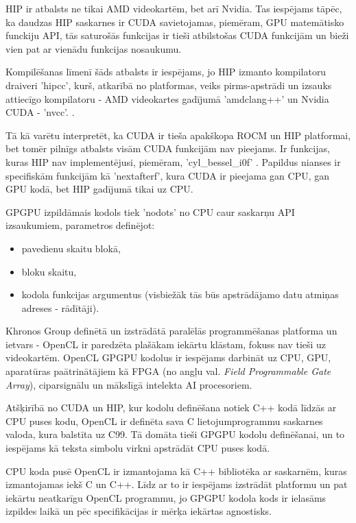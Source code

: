 HIP ir atbalsts ne tikai AMD videokartēm, bet arī Nvidia. Tas iespējams tāpēc, ka 
daudzas HIP saskarnes ir CUDA savietojamas, piemēram, GPU matemātisko funckiju API, tās saturošās funkcijas
ir tieši atbilstošas CUDA funkcijām un bieži vien pat ar vienādu funkcijas nosaukumu.
\cite{HIP_math_API,CUDA_math_API}

Kompilēšanas līmenī šāds atbalsts ir iespējams, jo HIP izmanto kompilatoru draiveri 'hipcc', kurš,
atkarībā no platformas, veiks pirms-apstrādi un izsauks attiecīgo kompilatoru -
AMD videokartes gadījumā 'amdclang++' un Nvidia CUDA - 'nvcc'. \cite{HIP_compilers}.

Tā kā varētu interpretēt, ka CUDA ir tieša apakškopa ROCM un HIP platformai, bet tomēr pilnīgs atbalsts
visām CUDA funkcijām nav pieejams. Ir funkcijas, kuras HIP nav implementējusi, piemēram,
'cyl\_bessel\_i0f' \cite{HIP_math_API}. Papildus nianses ir specifiskām funkcijām kā 'nextafterf', kura CUDA
ir pieejama gan CPU, gan GPU kodā, bet HIP gadījumā tikai uz CPU. \cite{HIP_math_API}

GPGPU izpildāmais kodols tiek 'nodots' no CPU caur saskarņu API izsaukumiem,
parametros definējot:
\begin{itemize}
    \item pavedienu skaitu blokā,
    \item bloku skaitu,
    \item kodola funkcijas argumentus (visbiežāk tās būs apstrādājamo datu
        atmiņas adreses - rādītāji). \cite{GPGPU_gramata}
\end{itemize}


Khronos Group definētā un izstrādātā paralēlās programmēšanas platforma un
ietvars - OpenCL ir paredzēta plašākam iekārtu klāstam, fokuss nav tieši uz
videokartēm. OpenCL GPGPU kodolus ir iespējams darbināt uz CPU, GPU,
aparatūras paātrinātājiem kā FPGA (no angļu val. \textit{Field Programmable Gate
Array}), ciparsignālu un mākslīgā intelekta AI procesoriem. \cite{opencl-spec}


Atšķirībā no CUDA un HIP, kur kodolu definēšana notiek C++ kodā līdzās ar CPU
puses kodu, OpenCL ir definēta sava C lietojumprogrammu saskarnes valoda, kura
balstīta uz C99.\cite{opencl_c_lang_spec} Tā domāta tieši GPGPU kodolu
definēšanai, un to iespējams kā teksta simbolu virkni apstrādāt CPU puses kodā.

CPU koda pusē OpenCL ir izmantojama kā C++ bibliotēka ar saskarnēm, kuras
izmantojamas iekš C un C++. Līdz ar to ir iespējams izstrādāt platformu un pat
iekārtu neatkarīgu OpenCL programmu, jo GPGPU kodola kods ir ielasāms izpildes
laikā un pēc specifikācijas ir mērķa iekārtas agnostisks. \cite{opencl-spec}

